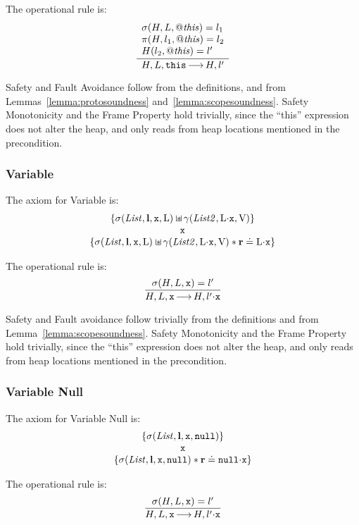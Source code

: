 \documentclass{article}
\begin{document}
The operational rule is:
\[\frac
{\begin{array}{l} \sigma(H,L,\mathit{@this})=l_1 \\ \pi(H,l_1,\mathit{@this})=l_2\\ H(l_2,\mathit{@this})=l' \end{array}}
{H,L,\mbox{\texttt{{\upshape this}}} {\,\longrightarrow\,} H,l'}
\]

Safety and Fault Avoidance follow from the definitions, and from Lemmas~\ref{lemma:protosoundness} and~\ref{lemma:scopesoundness}. Safety Monotonicity and the Frame Property hold trivially, since the ``this'' expression does not alter the heap, and only reads from heap locations mentioned in the precondition.

\subsubsection{Variable}

The axiom for Variable is:
\[\begin{array}{c}
\{\scope(\E{List},\ls,\js{x},\V{L})\sepish\getValue(\E{List2},\V{L}\sv\js{x},\LVAL)\}\\
{\js{x}}\\
\{\scope(\E{List},\ls,\js{x},\V{L})\sepish\getValue(\E{List2},\V{L}\sv\js{x},\LVAL)\sep \rv\doteq\V{L}\sv\js{x}\}
\end{array}
\]

The operational rule is:
\[\frac
{\scope(H,L,\js{x})=l' }
{H,L,\js{x} \levalsto H,l'\sv\js{x}}
\]

Safety and Fault avoidance follow trivially from the definitions and from Lemma~\ref{lemma:scopesoundness}. Safety Monotonicity and the Frame Property hold trivially, since the ``this'' expression does not alter the heap, and only reads from heap locations mentioned in the precondition.

\subsubsection{Variable Null}

The axiom for Variable Null is:
\[
\begin{array}{c}
\{\scope(\E{List},\ls,\js{x},\nil)\}\\
{\js{x}}\\
\{\scope(\E{List},\ls,\js{x},\nil) \sep \rv\doteq\nil\sv\js{x}\}
\end{array}
\]

The operational rule is:
\[\frac
{\scope(H,L,\js{x})=l' }
{H,L,\js{x} \levalsto H,l'\sv\js{x}}
\]
\end{document}
